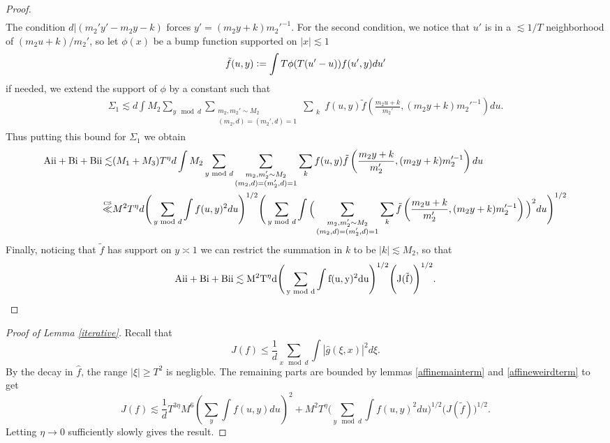 \begin{proof}
\begin{align*}
     \end{align*}
    The condition $d|(m_2'y'-m_2y-k)$ forces $y'= (m_2y+k)m_2'^{-1}$.
    For the second condition, we notice that $u'$ is in a $\lesssim 1/T$ neighborhood of $(m_2u+k)/m_2'$, so let $\phi(x)$ be a bump function supported on $|x|\lesssim 1$ \[
    \tilde{f}(u,y) \defeq \int T \phi(T(u'-u)) f(u',y) du'
    \]
    if needed, we extend the support of $\phi$ by a constant such that 
    \begin{align*}
        \Sigma_1\lesssim
        d \int  {M_2} \sum_{y\mod d}\sum_{\substack{m_2,m_2'\sim M_2\\(m_2,d)=(m_2',d)=1
        }} \sum_{\substack{k}}  f(u,y) \tilde{f}\left(\frac{m_2u+k}{m_2'},(m_2y+k)m_2'^{-1}\right)  du.
     \end{align*}
     Thus putting this bound for $\Sigma_1$ we obtain
     \begin{align*}
        \rm{Aii}+{Bi}+{Bii}\lesssim& (M_1+M_3)T^{\eta} d \int  {M_2} \sum_{y\mod d}\sum_{\substack{m_2,m_2'\sim M_2\\(m_2,d)=(m_2',d)=1
        }} \sum_{\substack{k}}  f(u,y) \tilde{f}\left(\frac{m_2y+k}{m_2'},(m_2y+k)m_2'^{-1}\right)  du\\
        \stackon{CS}{\ll}& M^2T^{\eta}d \Bigg(\sum_{y\mod d}\int f(u,y)^2 du \Bigg) ^{1/2}
        \Bigg(\sum_{y\mod d} \int \Big(\sum_{\substack{m_2,m_2'\sim M_2\\(m_2,d)=(m_2',d)=1
        }} \sum_{\substack{k}} \tilde{f}\left(\frac{m_2u+k}{m_2'},(m_2y+k)m_2'^{-1}\right)\Big)^2 du\Bigg) ^{1/2}
    \end{align*}
    Finally, noticing that $\tilde{f}$ has support on $y\asymp 1$ we can restrict the summation in $k$ to be $|k|\lesssim M_2$, so that 
    \begin{align*}
        \rm{Aii}+{Bi}+{Bii}\lesssim M^2T^{\eta}d \Bigg(\sum_{y\mod d}\int f(u,y)^2 du \Bigg) ^{1/2}
        \Bigg(J(\tilde{f})\Bigg) ^{1/2}.
    \end{align*}
\end{proof}
\begin{proof}[Proof of Lemma \ref{iterative}]
    Recall that\[
J(f)\leq \frac{1}{d}\sum_{x\mod d} \int |\hat{g}(\xi,x)|^2 d\xi.
\]
By the decay in $\hat{f}$, the range $|\xi|\geq T^2$ is negligble. The remaining parts are bounded by lemmas \ref{affinemainterm} and \ref{affineweirdterm} to get \[
J(f)\lesssim \frac{1}{d}T^{3\eta}M^6\left(\sum_y \int f(u,y) du\right)^2+ M^2T^{\eta} \Bigg(\sum_{y\mod d}\int f(u,y)^2 du \Bigg) ^{1/2}
\Bigg(J(\tilde{f})\Bigg) ^{1/2}.
\]
Letting $\eta \to 0$ sufficiently slowly gives the result.
\end{proof}
